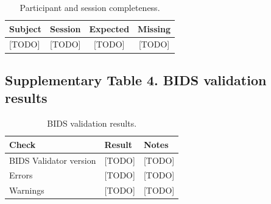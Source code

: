 \begin{table}[htbp]
\centering
\caption{Participant and session completeness.}
\label{tab:supp-completeness}
\begin{tabular}{@{}lccc@{}}
\toprule
\textbf{Subject} & \textbf{Session} & \textbf{Expected} & \textbf{Missing} \\
\midrule
{[TODO]} & {[TODO]} & {[TODO]} & {[TODO]} \\
\bottomrule
\end{tabular}
\end{table}

\subsection*{Supplementary Table 4. BIDS validation results}

\begin{table}[htbp]
\centering
\caption{BIDS validation results.}
\label{tab:supp-bids-validation}
\begin{tabular}{@{}lll@{}}
\toprule
\textbf{Check} & \textbf{Result} & \textbf{Notes} \\
\midrule
BIDS Validator version & {[TODO]} & {[TODO]} \\
Errors & {[TODO]} & {[TODO]} \\
Warnings & {[TODO]} & {[TODO]} \\
\bottomrule
\end{tabular}
\end{table}

